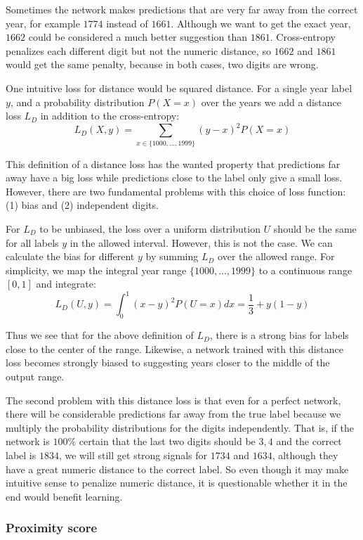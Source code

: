 Sometimes the network makes predictions that are very far away from the correct year, for example $1774$ instead of $1661$. Although we want to get the exact year, $1662$ could be considered a much better suggestion than $1861$. Cross-entropy penalizes each different digit but not the numeric distance, so $1662$ and $1861$ would get the same penalty, because in both cases, two digits are wrong.

One intuitive loss for distance would be squared distance. For a single year label $y$, and a probability distribution $P(X=x)$ over the years we add a distance loss $L_D$ in addition to the cross-entropy:
\[
L_D(X, y) = \sum_{x \in \{1000, \ldots, 1999\}} (y-x)^2 P(X=x)
\]

This definition of a distance loss has the wanted property that predictions far away have a big loss while predictions close to the label only give a small loss. However, there are two fundamental problems with this choice of loss function: (1) bias and (2) independent digits.

For $L_D$ to be unbiased, the loss over a uniform distribution $U$ should be the same for all labels $y$ in the allowed interval. However, this is not the case. We can calculate the bias for different $y$ by summing $L_D$ over the allowed range. For simplicity, we map the integral year range $\{ 1000, \ldots, 1999 \}$ to a continuous range $[0,1]$ and integrate:
\[
L_D(U, y) = \int_0^1 (x-y)^2 P(U=x) dx = \frac{1}{3} + y(1-y)
\]

Thus we see that for the above definition of $L_D$, there is a strong bias for labels close to the center of the range. Likewise, a network trained with this distance loss becomes strongly biased to suggesting years closer to the middle of the output range.


The second problem with this distance loss is that even for a perfect network, there will be considerable predictions far away from the true label because we multiply the probability distributions for the digits independently. That is, if the network is $100\%$ certain that the last two digits should be $3, 4$ and the correct label is $1834$, we will still get strong signals for $1734$ and $1634$, although they have a great numeric distance to the correct label.
So even though it may make intuitive sense to penalize numeric distance, it is questionable whether it in the end would benefit learning.

\subsubsection{Proximity score}

